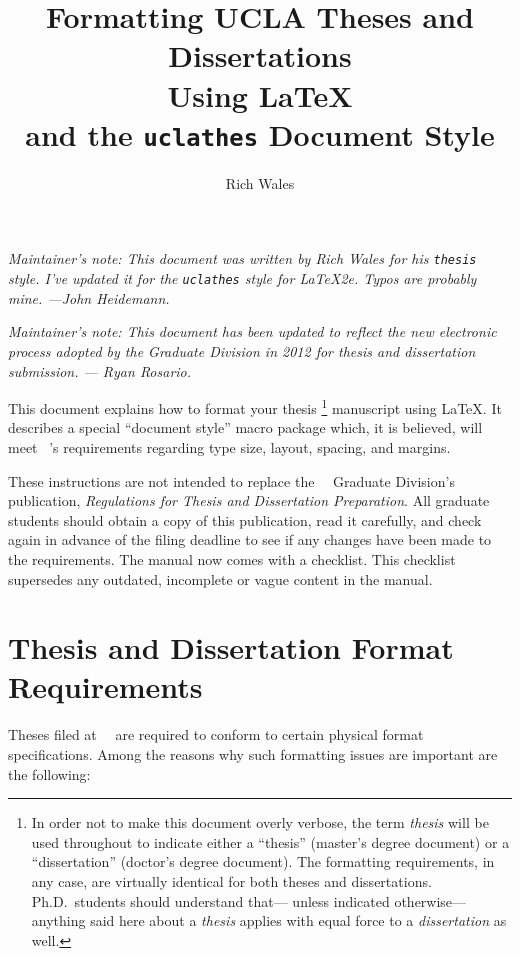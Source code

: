 \documentclass {article}
\title	{ Formatting UCLA Theses and Dissertations \\
	 Using \LaTeX \\
	 and the \texttt{uclathes} Document Style}
\author {Rich Wales}
\date{}
\newcommand {\caps}[1] {\mbox {\ifnum\fam=0 \scshape\else\uppercase\fi{#1}}}
\newcommand {\regs} {{\sl Regulations for Thesis
		      and Dissertation Preparation}}
\newcommand {\ucla} {\caps {ucla}}
\begin{document}
\maketitle

\newcommand{\MaintainNote}[1]{{\slshape Maintainer's note:  #1}}

\MaintainNote{
  This document was written by Rich Wales for his \texttt{thesis} style.
  I've updated it for the \texttt{uclathes} style for \LaTeX 2e.
  Typos are probably mine.
   ---John Heidemann.}

\MaintainNote{
  This document has been updated to reflect the new electronic process
  adopted by the Graduate Division in 2012 for thesis and dissertation
  submission.
  --- Ryan Rosario.}

This document explains how to format your thesis%
\footnote {In order not to make this document overly verbose,
the term {\em thesis\/} will be used throughout
to indicate either a ``thesis'' (master's degree document)
or a ``dissertation'' (doctor's degree document).
The formatting requirements, in any case,
are virtually identical for both theses and dissertations.
Ph.D.\ students should understand that---%
unless indicated otherwise---%
anything said here about a {\em thesis\/}
applies with equal force to a {\em dissertation\/} as well.}
manuscript using \LaTeX.
It describes a special ``document style'' macro package
which, it is believed, will meet \ucla's requirements
regarding type size, layout, spacing, and margins.

These instructions are not intended to replace
the \ucla\ Graduate Division's publication, \regs.
All graduate students should obtain a copy of this publication,
read it carefully, and check again in advance
of the filing deadline to see if any changes have been made
to the requirements. The manual now comes with a checklist.
This checklist supersedes any outdated, incomplete or vague
 content in the manual.


\section {Thesis and Dissertation Format Requirements}

Theses filed at \ucla\ are required to conform
to certain physical format specifications.
Among the reasons why such formatting issues are important
are the following:
\end{document}
